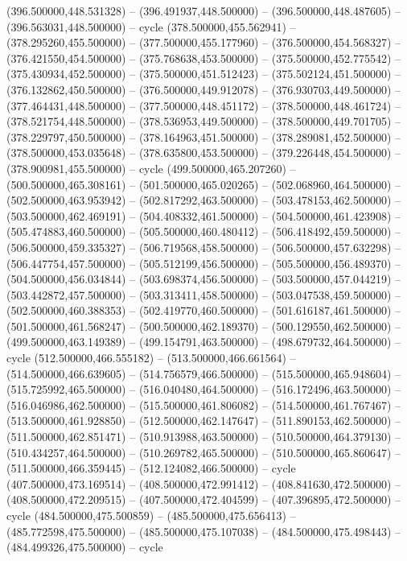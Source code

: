    (396.500000,448.531328) -- (396.491937,448.500000) -- (396.500000,448.487605) -- (396.563031,448.500000) -- cycle
   (378.500000,455.562941) -- (378.295260,455.500000) -- (377.500000,455.177960) -- (376.500000,454.568327) -- (376.421550,454.500000) -- (375.768638,453.500000) -- (375.500000,452.775542) -- (375.430934,452.500000) -- (375.500000,451.512423) -- (375.502124,451.500000) -- (376.132862,450.500000) -- (376.500000,449.912078) -- (376.930703,449.500000) -- (377.464431,448.500000) -- (377.500000,448.451172) -- (378.500000,448.461724) -- (378.521754,448.500000) -- (378.536953,449.500000) -- (378.500000,449.701705) -- (378.229797,450.500000) -- (378.164963,451.500000) -- (378.289081,452.500000) -- (378.500000,453.035648) -- (378.635800,453.500000) -- (379.226448,454.500000) -- (378.900981,455.500000) -- cycle
   (499.500000,465.207260) -- (500.500000,465.308161) -- (501.500000,465.020265) -- (502.068960,464.500000) -- (502.500000,463.953942) -- (502.817292,463.500000) -- (503.478153,462.500000) -- (503.500000,462.469191) -- (504.408332,461.500000) -- (504.500000,461.423908) -- (505.474883,460.500000) -- (505.500000,460.480412) -- (506.418492,459.500000) -- (506.500000,459.335327) -- (506.719568,458.500000) -- (506.500000,457.632298) -- (506.447754,457.500000) -- (505.512199,456.500000) -- (505.500000,456.489370) -- (504.500000,456.034844) -- (503.698374,456.500000) -- (503.500000,457.044219) -- (503.442872,457.500000) -- (503.313411,458.500000) -- (503.047538,459.500000) -- (502.500000,460.388353) -- (502.419770,460.500000) -- (501.616187,461.500000) -- (501.500000,461.568247) -- (500.500000,462.189370) -- (500.129550,462.500000) -- (499.500000,463.149389) -- (499.154791,463.500000) -- (498.679732,464.500000) -- cycle
   (512.500000,466.555182) -- (513.500000,466.661564) -- (514.500000,466.639605) -- (514.756579,466.500000) -- (515.500000,465.948604) -- (515.725992,465.500000) -- (516.040480,464.500000) -- (516.172496,463.500000) -- (516.046986,462.500000) -- (515.500000,461.806082) -- (514.500000,461.767467) -- (513.500000,461.928850) -- (512.500000,462.147647) -- (511.890153,462.500000) -- (511.500000,462.851471) -- (510.913988,463.500000) -- (510.500000,464.379130) -- (510.434257,464.500000) -- (510.269782,465.500000) -- (510.500000,465.860647) -- (511.500000,466.359445) -- (512.124082,466.500000) -- cycle
   (407.500000,473.169514) -- (408.500000,472.991412) -- (408.841630,472.500000) -- (408.500000,472.209515) -- (407.500000,472.404599) -- (407.396895,472.500000) -- cycle
   (484.500000,475.500859) -- (485.500000,475.656413) -- (485.772598,475.500000) -- (485.500000,475.107038) -- (484.500000,475.498443) -- (484.499326,475.500000) -- cycle
